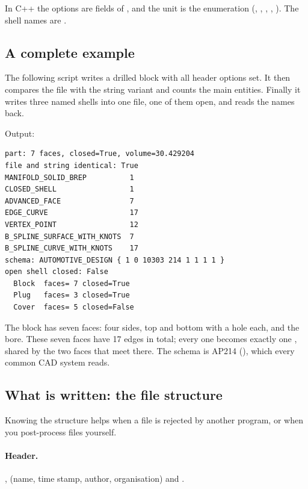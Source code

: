 \begin{note}
In C++ the options are fields of , and the unit is the enumeration
 (, , , ,
). The shell names are .
\end{note}

\subsection{A complete example}

The following script writes a drilled block with all header options set. It then compares the
file with the string variant and counts the main entities. Finally it writes three named
shells into one file, one of them open, and reads the names back.


Output:

\begin{lstlisting}[style=text]
part: 7 faces, closed=True, volume=30.429204
file and string identical: True
MANIFOLD_SOLID_BREP          1
CLOSED_SHELL                 1
ADVANCED_FACE                7
EDGE_CURVE                   17
VERTEX_POINT                 12
B_SPLINE_SURFACE_WITH_KNOTS  7
B_SPLINE_CURVE_WITH_KNOTS    17
schema: AUTOMOTIVE_DESIGN { 1 0 10303 214 1 1 1 1 }
open shell closed: False
  Block  faces= 7 closed=True
  Plug   faces= 3 closed=True
  Cover  faces= 5 closed=False
\end{lstlisting}

The block has seven faces: four sides, top and bottom with a hole each, and the bore.
These seven faces have 17 edges in total; every one becomes exactly one ,
shared by the two faces that meet there. The schema is AP214 (), which
every common CAD system reads.

\subsection{What is written: the file structure}\label{sec:step-structure}

Knowing the structure helps when a file is rejected by another program, or when you post-process
files yourself.

\paragraph{Header.} ,  (name, time stamp, author,
organisation) and .

